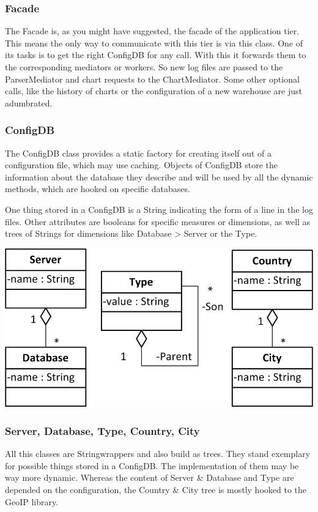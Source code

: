 \subsubsection*{Facade}
The Facade is, as you might have suggested, the facade of the application tier. 
This means the only way to communicate with this tier is via this class.
One of its tasks is to get the right ConfigDB for any call. With this it forwards
them to the corresponding mediators or workers. So new log files are passed to
the ParserMediator and chart requests to the ChartMediator. Some other optional
calls, like the history of charts or the configuration of a new warehouse are just
adumbrated. %


\subsubsection*{ConfigDB}
The ConfigDB class provides a static factory for creating itself out of a configuration
file, which may use caching. Objects of ConfigDB store the information about the database
they describe and will be used by all the dynamic methods, which are hooked on specific
databases. 

One thing stored in a ConfigDB is a String indicating the form of a line in the log files.
Other attributes are booleans for specific measures or dimensions, as well as trees of
Strings for dimensions like Database > Server or the Type.

\newpage
\begin{center}
\includegraphics{Pictures/Parts/Strings.png}
\end{center}  
\subsubsection*{Server, Database, Type, Country, City}
All this classes are Stringwrappers and also build as trees. They stand exemplary for
possible things stored in a ConfigDB. The implementation of them may be way more dynamic.
Whereas the content of Server \& Database and Type are depended on the configuration,
the Country \& City tree is mostly hooked to the GeoIP library.


